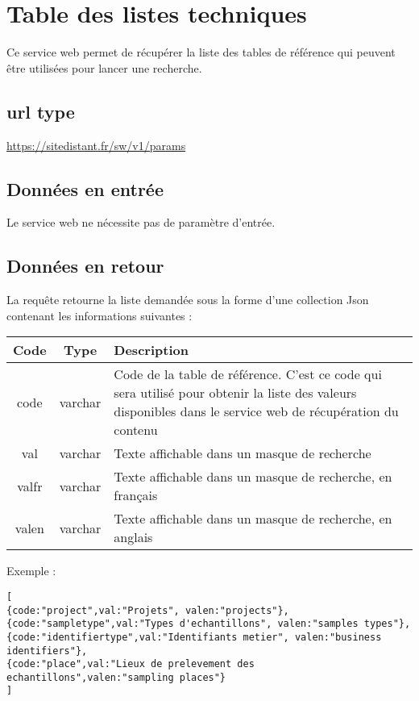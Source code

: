 \section{Table des listes techniques}

Ce service web permet de récupérer la liste des tables de référence qui peuvent être utilisées pour lancer une recherche.

\subsection{url type}
\url{https://sitedistant.fr/sw/v1/params}

\subsection{Données en entrée}
Le service web ne nécessite pas de paramètre d'entrée.


\subsection{Données en retour}
La requête retourne la liste demandée sous la forme d'une collection Json contenant les informations suivantes :

\begin{longtable}{|c|c|>{\raggedright\arraybackslash}p{6cm}|}
\hline 
Code & Type & Description \\ 
\hline
code & varchar & Code de la table de référence. C'est ce code qui sera utilisé pour obtenir la liste des valeurs disponibles dans le service web de récupération du contenu\\
\hline
val & varchar & Texte affichable dans un masque de recherche\\
\hline
valfr & varchar & Texte affichable dans un masque de recherche, en français\\
\hline
valen & varchar & Texte affichable dans un masque de recherche, en anglais\\
\hline \endhead
\end{longtable}

Exemple :
\begin{lstlisting}
[
{code:"project",val:"Projets", valen:"projects"},
{code:"sampletype",val:"Types d'echantillons", valen:"samples types"},
{code:"identifiertype",val:"Identifiants metier", valen:"business identifiers"},
{code:"place",val:"Lieux de prelevement des echantillons",valen:"sampling places"}
]
\end{lstlisting}

